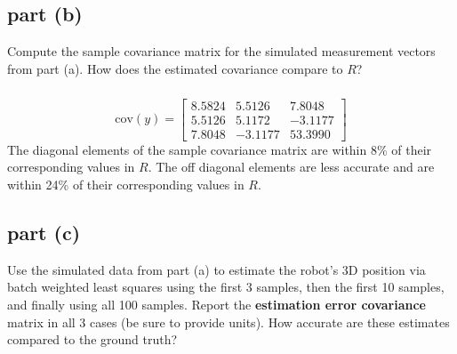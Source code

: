 \documentclass[11pt]{article}
\begin{document}
\subsection*{part (b)}
Compute the sample covariance matrix for the simulated measurement vectors from part (a). How does the estimated covariance compare to $R$?

\subparagraph*{}
\begin{equation*}
	\text{cov}(y) = \begin{bmatrix} 8.5824 & 5.5126 & 7.8048 \\
									5.5126 & 5.1172 & -3.1177 \\ 
									7.8048 & -3.1177 & 53.3990 \end{bmatrix}
\end{equation*}
The diagonal elements of the sample covariance matrix are within 8\% of their corresponding values in $R$. The off diagonal elements are less accurate and are within 24\% of their corresponding values in $R$. 

\subsection*{part (c)}
Use the simulated data from part (a) to estimate the robot's 3D position via batch weighted least squares using the first 3 samples, then the first 10 samples, and finally using all 100 samples. Report the \textbf{estimation error covariance} matrix in all 3 cases (be sure to provide units). How accurate are these estimates compared to the ground truth?
\end{document}
